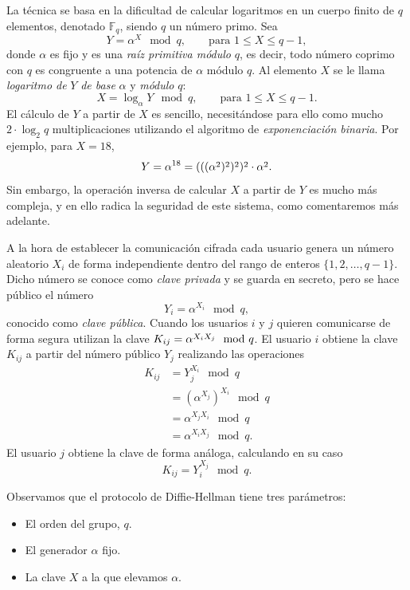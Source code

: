\documentclass[
  a4paper,
  12pt,
  spanish,
]{scrartcl}
\begin{document}
La técnica se basa en la dificultad de calcular logaritmos en un cuerpo finito de \(q\) elementos, denotado \(\mathbb F_q\), siendo \(q\) un número primo.
Sea \[Y = \alpha^X \mod q, \qquad \text{para } 1 \leq X \leq q - 1,\] donde \(\alpha\) es fijo y es una \textit{raíz primitiva módulo} \(q\), es decir, todo número coprimo con \(q\) es congruente a una potencia de \(\alpha\) módulo \(q\).
Al elemento \(X\) se le llama \textit{logaritmo de} \(Y\) \textit{de base} \(\alpha\) y \textit{módulo} \(q\): \[X = \log_{\alpha} Y \mod q, \qquad \text{para } 1 \leq X \leq q - 1.\]
El cálculo de \(Y\) a partir de \(X\) es sencillo, necesitándose para ello como mucho \(2 \cdot \log_2 q\) multiplicaciones utilizando el algoritmo de \textit{exponenciación binaria}. Por ejemplo, para \(X = 18\), \[Y = \alpha^{18} = \cramped{(((\alpha^2)^2)^2)^2} \cdot \cramped{\alpha^2}.\]
Sin embargo, la operación inversa de calcular \(X\) a partir de \(Y\) es mucho más compleja, y en ello radica la seguridad de este sistema, como comentaremos más adelante.

A la hora de establecer la comunicación cifrada cada usuario genera un número aleatorio \(X_i\) de forma independiente dentro del rango de enteros \(\{1, 2, \dots, q - 1\}\).
Dicho número se conoce como \textit{clave privada} y se guarda en secreto, pero se hace público el número \[Y_i = \alpha^{X_i} \mod q,\] conocido como \textit{clave pública}.
Cuando los usuarios \(i\) y \(j\) quieren comunicarse de forma segura utilizan la clave \(K_{ij} = \cramped{\alpha^{X_iX_j}} \mod q\).
El usuario \(i\) obtiene la clave \(K_{ij}\) a partir del número público \(Y_j\) realizando las operaciones \begin{align*}
  K_{ij} &= Y_j^{X_i} \mod q \\
    &= (\alpha^{X_j})^{X_i} \mod q \\
    &= \alpha^{X_jX_i} \mod q \\
    &= \alpha^{X_iX_j} \mod q.
\end{align*}
El usuario \(j\) obtiene la clave de forma análoga, calculando en su caso \[K_{ij} = Y_i^{X_j} \mod q.\]

Observamos que el protocolo de Diffie-Hellman tiene tres parámetros: \begin{itemize}
  \item El orden del grupo, \(q\).
  \item El generador \(\alpha\) fijo.
  \item La clave \(X\) a la que elevamos \(\alpha\).
\end{itemize}
\end{document}
